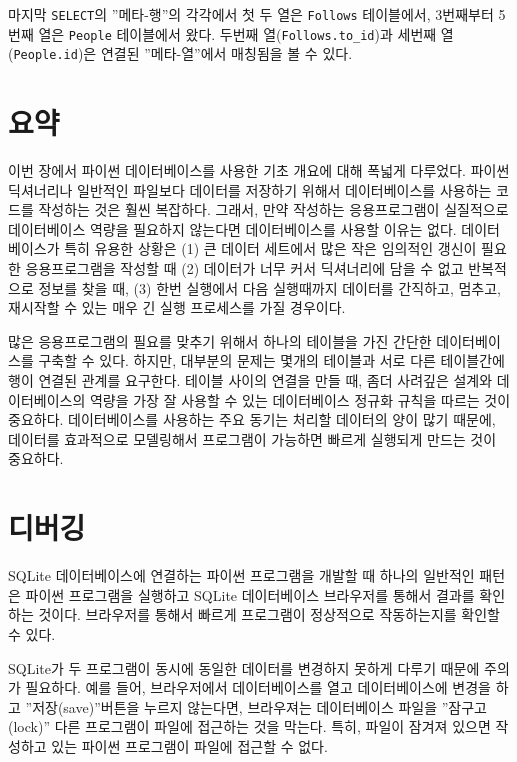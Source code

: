 마지막 {\tt SELECT}의 ''메타-행''의 각각에서 첫 두 열은 {\tt Follows} 테이블에서, 3번째부터 5번째 열은 {\tt People}
테이블에서 왔다. 두번째 열(\verb"Follows.to_id")과 세번째 열({\tt People.id})은 연결된 ''메타-열''에서 매칭됨을 볼 수 있다.

\section{요약}

이번 장에서 파이썬 데이터베이스를 사용한 기초 개요에 대해 폭넓게 다루었다.
파이썬 딕셔너리나 일반적인 파일보다 데이터를 저장하기 위해서 데이터베이스를 사용하는 코드를 작성하는 것은 훨씬 복잡하다.
그래서, 만약 작성하는 응용프로그램이 실질적으로 데이터베이스 역량을 필요하지 않는다면 데이터베이스를 사용할 이유는 없다.
데이터베이스가 특히 유용한 상황은 (1) 큰 데이터 세트에서 많은 작은 임의적인 갱신이 필요한 응용프로그램을 작성할 때
(2) 데이터가 너무 커서 딕셔너리에 담을 수 없고 반복적으로 정보를 찾을 때, (3) 한번 실행에서 다음 실행때까지 데이터를 
간직하고, 멈추고, 재시작할 수 있는 매우 긴 실행 프로세스를 가질 경우이다.

많은 응용프로그램의 필요를 맞추기 위해서 하나의 테이블을 가진 간단한 데이터베이스를 구축할 수 있다.
하지만, 대부분의 문제는 몇개의 테이블과 서로 다른 테이블간에 행이 연결된 관계를 요구한다.
테이블 사이의 연결을 만들 때, 좀더 사려깊은 설계와 데이터베이스의 역량을 가장 잘 사용할 수 있는 데이터베이스 정규화 규칙을
따르는 것이 중요하다. 데이터베이스를 사용하는 주요 동기는 처리할 데이터의 양이 많기 때문에, 
데이터를 효과적으로 모델링해서 프로그램이 가능하면 빠르게 실행되게 만드는 것이 중요하다.

\section{디버깅}

SQLite 데이터베이스에 연결하는 파이썬 프로그램을 개발할 때 하나의 일반적인 패턴은
파이썬 프로그램을 실행하고 SQLite 데이터베이스 브라우저를 통해서 결과를 확인하는 것이다.
브라우저를 통해서 빠르게 프로그램이 정상적으로 작동하는지를 확인할 수 있다.

SQLite가 두 프로그램이 동시에 동일한 데이터를 변경하지 못하게 다루기 때문에 주의가 필요하다.
예를 들어, 브라우저에서 데이터베이스를 열고 데이터베이스에 변경을 하고 ''저장(save)''버튼을 누르지 않는다면,
브라우져는 데이터베이스 파일을 ''잠구고(lock)'' 다른 프로그램이 파일에 접근하는 것을 막는다.
특히, 파일이 잠겨져 있으면 작성하고 있는 파이썬 프로그램이 파일에 접근할 수 없다.

